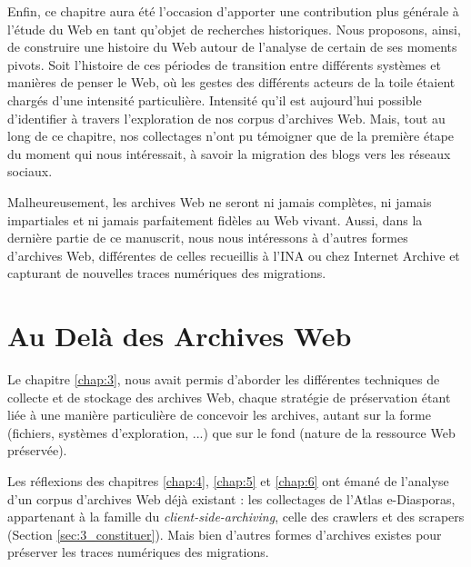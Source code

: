 \documentclass[symmetric,justified,marginals=raggedouter]{tufte-book}
\begin{document}
Enfin, ce chapitre aura été l'occasion d'apporter une contribution plus générale à l'étude du Web en tant qu'objet de recherches historiques. Nous proposons, ainsi, de construire une histoire du Web autour de l'analyse de certain de ses moments pivots. Soit l'histoire de ces périodes de transition entre différents systèmes et manières de penser le Web, où les gestes des différents acteurs de la toile étaient chargés d'une intensité particulière. Intensité qu'il est aujourd'hui possible d'identifier à travers l'exploration de nos corpus d'archives Web. Mais, tout au long de ce chapitre, nos collectages n'ont pu témoigner que de la première étape du moment qui nous intéressait, à savoir la migration des blogs vers les réseaux sociaux.

Malheureusement, les archives Web ne seront ni jamais complètes, ni jamais impartiales et ni jamais parfaitement fidèles au Web vivant. Aussi, dans la dernière partie de ce manuscrit, nous nous intéressons à d'autres formes d'archives Web, différentes de celles recueillis à l'INA ou chez Internet Archive et capturant de nouvelles traces numériques des migrations.



\chapter{Au Delà des Archives Web}
\label{chap:7}

\noindent Le chapitre \ref{chap:3}, nous avait permis d'aborder les différentes techniques de collecte et de stockage des archives Web, chaque stratégie de préservation étant liée à une manière particulière de concevoir les archives, autant sur la forme (fichiers, systèmes d'exploration, ...) que sur le fond (nature de la ressource Web préservée).

Les réflexions des chapitres \ref{chap:4}, \ref{chap:5} et \ref{chap:6} ont émané de l'analyse d'un corpus d'archives Web déjà existant : les collectages de l'Atlas e-Diasporas, appartenant à la famille du \textit{client-side-archiving}, celle des crawlers et des scrapers (Section \ref{sec:3_constituer}). Mais bien d'autres formes d'archives existes pour préserver les traces numériques des migrations. 
\end{document}
